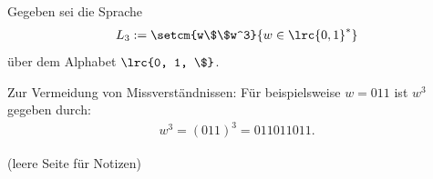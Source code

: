 \begin{questions}
	\droptotalpoints
	\clearpage

	Gegeben sei die Sprache
	\begin{align*}
		L_3 := \setcm{w\$\$w^3}{w\in\lrc{0, 1}^*}
	\end{align*}
	über dem Alphabet $\lrc{0, 1, \$}$.

	Zur Vermeidung von Missverständnissen: Für beispielsweise $w = 011$ ist $w^3$
	gegeben durch:
	\begin{align*}
		w^3 = (011)^3 = 011011011.
	\end{align*}

	\droptotalpoints
\end{questions}

\clearpage
(leere Seite für Notizen)
